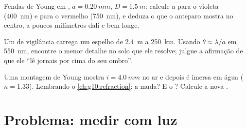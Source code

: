 \begin{exercise}[$\star\star\star$]\label{exo:g12:light-as-wave:13}
Fendas de Young em , $a = \qty{0.20}{mm}$, $D = \qty{1.5}{m}$:
calcule a  para o violeta (\qty{400}{nm}) e para o vermelho
(\qty{750}{nm}), e deduza o que o anteparo mostra no centro, a poucos
milímetros dali e bem longe.
\end{exercise}

\begin{exercise}[$\star\star\star$]\label{exo:g12:light-as-wave:14}
Um  de vigilância carrega um espelho de \qty{2.4}{m} a
\qty{250}{km}. Usando $\theta \approx \lambda/a$ em \qty{550}{nm},
encontre o menor detalhe no solo que ele resolve; julgue a afirmação de
que ele ``lê jornais por cima do seu ombro''.
\end{exercise}

\begin{exercise}[$\star\star\star$]\label{exo:g12:light-as-wave:15}
Uma montagem de Young mostra $i = \qty{4.0}{mm}$ no ar e depois é imersa
em água ($n = 1.33$). Lembrando o \cref{ch:g10:refraction}: a 
muda? E o ? Calcule a nova .
\end{exercise}

\section{Problema: medir com luz}


